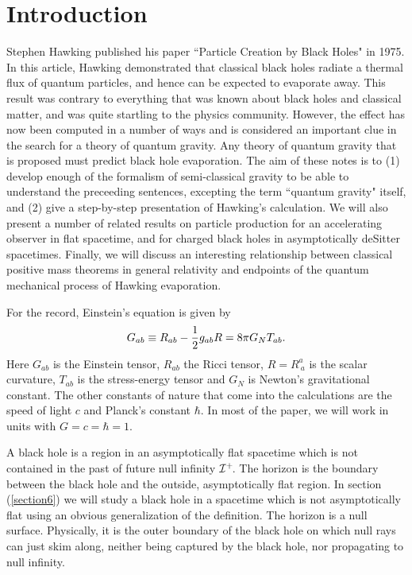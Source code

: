 \documentclass[12pt]{article}
\newcommand{\be}{\begin{equation}}
\newcommand{\ee}{\end{equation}}
\newcommand{\sectiono}[1]{\section{#1}\setcounter{equation}{0}}
\def\finf{{\cal I}^+}
\begin{document}
\setcounter{equation}{0}

\newpage

\tableofcontents

\newpage

\sectiono{Introduction}

Stephen Hawking published his paper ``Particle Creation by Black Holes"
\cite{hawking} in 1975.  In this article, Hawking demonstrated that classical black
holes radiate a thermal flux of quantum particles, and hence can be
expected to evaporate away.
This result was contrary to everything that was known about black holes and
classical
matter, and was quite startling to the physics community. However, the
effect has now been
computed in a number of ways and is considered an important clue in the
search for a theory
of quantum gravity.  Any theory of quantum gravity that is proposed must
predict black hole
evaporation.  The aim of these notes is to (1) develop enough of the
formalism of
semi-classical gravity to be able to understand the preceeding sentences,
excepting the term
``quantum gravity" itself, and (2) give a  step-by-step presentation of
Hawking's
calculation. We will also present a number of  related results on particle
production for an
accelerating observer in flat spacetime, and  for charged black holes in
asymptotically
deSitter spacetimes. Finally, we will discuss an interesting relationship
between classical positive
mass theorems in general relativity and endpoints of the quantum mechanical
process of Hawking evaporation.

For the record, Einstein's equation is given by
%
\be\label{einstein}G_{ab}\equiv R_{ab} -{1\over 2} g_{ab} R = 8\pi G_N
T_{ab} .\ee
%
Here $G_{ab}$ is the Einstein tensor, $R_{ab}$ the Ricci tensor, $R= R^a
_{\ a}$ is the scalar
curvature, $T_{ab}$ is the stress-energy tensor and $G_N$ is Newton's
gravitational constant. The
other constants of nature that come into the calculations are the speed of
light $c$ and
Planck's constant $\hbar$. In most of the paper, we will work in units with
$G=c=\hbar
=1$.

A black hole is a region in an asymptotically flat spacetime which is not
contained in the
past of future null infinity $\finf\!$.  The horizon is the
boundary between the black hole and the outside, asymptotically flat region.
In section (\ref{section6}) we will study a black hole in a spacetime which is not
asymptotically flat using an obvious generalization of the definition.
The horizon is a null surface. Physically, it is the outer boundary of the
black hole on which
null rays can just skim along, neither being captured by the black hole,
nor propagating
to null infinity.
\end{document}
